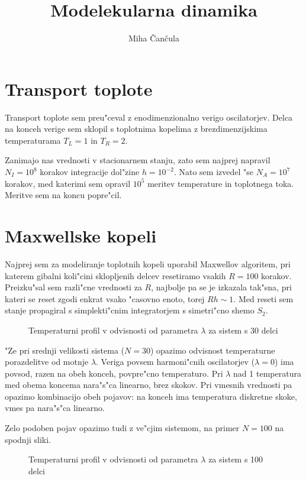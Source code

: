 \documentclass[a4paper,10pt]{article}
\title{Modelekularna dinamika}
\author{Miha \v Can\v cula}
\begin{document}
\maketitle

\section{Transport toplote}

Transport toplote sem preu"ceval z enodimenzionalno verigo oscilatorjev. 
Delca na konceh verige sem sklopil s toplotnima kopelima z brezdimenzijskima temperaturama $T_L=1$ in $T_R=2$. 

Zanimajo nas vrednosti v stacionarnem stanju, zato sem najprej napravil $N_I = 10^{8}$ korakov integracije dol"zine $h=10^{-2}$. 
Nato sem izvedel "se $N_A=10^{7}$ korakov, med katerimi sem opravil $10^{5}$ meritev temperature in toplotnega toka. 
Meritve sem na koncu popre"cil. 

\section{Maxwellske kopeli}

Najprej sem za modeliranje toplotnih kopeli uporabil Maxwellov algoritem, pri katerem gibalni koli"cini sklopljenih delcev resetiramo vsakih $R=100$ korakov. 
Preizku"sal sem razli"cne vrednosti za $R$, najbolje pa se je izkazala tak"sna, pri kateri se reset zgodi enkrat vsako "casovno enoto, torej $Rh \sim 1$. 
Med reseti sem stanje propagiral s simplekti"cnim integratorjem s simetri"cno shemo $S_2$. 

\begin{figure}[H]
 \centering
 
  \caption{Temperaturni profil v odvisnosti od parametra $\lambda$ za sistem s 30 delci}
\end{figure}


"Ze pri srednji velikosti sistema ($N=30$) opazimo odvisnost temperaturne porazdelitve od motnje $\lambda$. 
Veriga povsem harmoni"cnih oscilatorjev ($\lambda=0$) ima povsod, razen na obeh konceh, povpre"cno temperaturo. 
Pri $\lambda$ nad 1 temperatura med obema koncema nara"s"ca linearno, brez skokov. 
Pri vmesnih vrednosti pa opazimo kombinacijo obeh pojavov: na konceh ima temperatura diskretne skoke, vmes pa nara"s"ca linearno. 

Zelo podoben pojav opazimo tudi z ve"cjim sistemom, na primer $N=100$ na spodnji sliki. 


\begin{figure}[H]
 \centering
 
  \caption{Temperaturni profil v odvisnosti od parametra $\lambda$ za sistem s 100 delci}
\end{figure}
\end{document}
